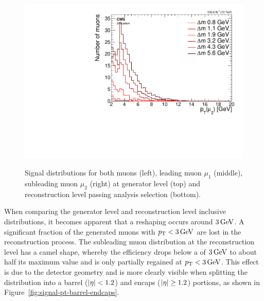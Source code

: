 \begin{figure}[!htb]
\includegraphics[width=0.32\linewidth]{plots/signal_muons/none_Muons_m2_pt.pdf} \\
\caption[Signal \pt distributions]{ Signal \pt distributions for both muons (left), leading muon $\mu_1$ (middle),  subleading muon $\mu_2$ (right) at generator level (top) and reconstruction level passing analysis selection (bottom). }
\label{fig:signal-muons-pt}
\end{figure}

When comparing the generator level and reconstruction level inclusive \pt distributions, it becomes apparent that a reshaping occurs around $3 \,\text{Ge\hspace{-.08em}V}$. A significant fraction of the generated muons with $p_{\mathrm{T}}<3\,\text{Ge\hspace{-.08em}V}$ are lost in the reconstruction process. The subleading muon \pt distribution at the reconstruction level has a camel shape, whereby the efficiency drops below a \pt of $3\,\text{Ge\hspace{-.08em}V}$ to about half its maximum value and is only partially regained at $p_{\mathrm{T}}<3\,\text{Ge\hspace{-.08em}V}$. This effect is due to the detector geometry and is more clearly visible when splitting the \pt distribution into a barrel ($\abs{\eta} < 1.2$) and encaps ($\abs{\eta} \geq 1.2$) portions, as shown in Figure~\ref{fig:signal-pt-barrel-endcaps}.

